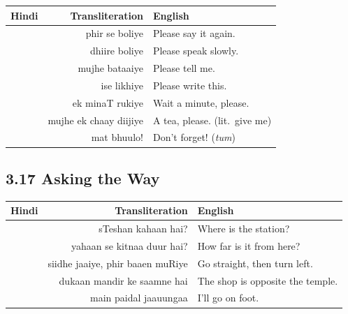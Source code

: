 \begin{tabular}{@{}HRG@{}}
  \toprule
  Hindi & Transliteration & English \\
  \midrule
                 & phir se boliye           & Please say it again. \\
                   & dhiire boliye            & Please speak slowly. \\
                   & mujhe bataaiye           & Please tell me. \\
                    & ise likhiye              & Please write this. \\
                & ek minaT rukiye          & Wait a minute, please. \\
             & mujhe ek chaay diijiye   & A tea, please. (lit.\ give me) \\
                      & mat bhuulo!              & Don't forget! (\textit{tum}) \\
  \bottomrule
\end{tabular}

\subsection{3.17 Asking the Way}


\begin{tabular}{@{}HRG@{}}
  \toprule
  Hindi & Transliteration & English \\
  \midrule
               & sTeshan kahaan hai?      & Where is the station? \\
          & yahaan se kitnaa duur hai? & How far is it from here? \\
     & siidhe jaaiye, phir baaen muRiye & Go straight, then turn left. \\
       & dukaan mandir ke saamne hai & The shop is opposite the temple. \\
              & main paidal jaauungaa    & I'll go on foot. \\
  \bottomrule
\end{tabular}

